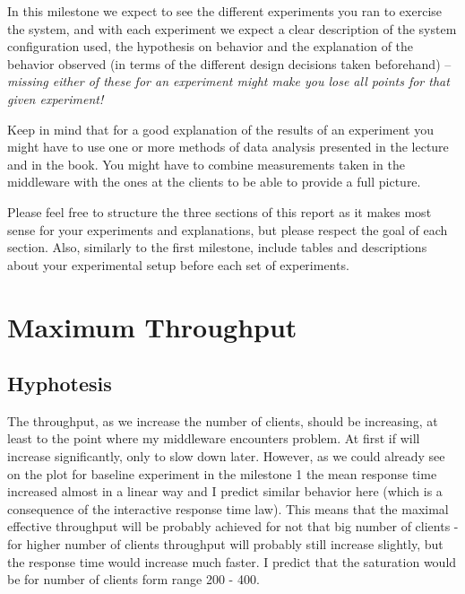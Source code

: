 \documentclass[11pt]{article}
\begin{document}
In this milestone we expect to see the different experiments you ran to exercise the system, and with each experiment we expect a clear description of the system configuration used, the hypothesis on behavior and the explanation of the behavior observed (in terms of the different design decisions taken beforehand) -- \emph{missing either of these for an experiment might make you lose all points for that given experiment!} 

Keep in mind that for a good explanation of the results of an experiment you might have to use one or more methods of data analysis presented in the lecture and in the book. You might have to combine measurements taken in the middleware with the ones at the clients to be able to provide a full picture.

Please feel free to structure the three sections of this report as it makes most sense for your experiments and explanations, but please respect the goal of each section. Also, similarly to the first milestone, include tables and descriptions about your experimental setup before each set of experiments.


\pagebreak

\section{Maximum Throughput}
\label{sec:max-throughput}


\subsection{Hyphotesis}

The throughput, as we increase the number of clients, should be increasing, at least to the point where my middleware encounters problem. At first if will increase significantly, only to slow down later. However, as we could already see on the plot for baseline experiment in the milestone 1 the mean response time increased almost in a linear way and I predict similar behavior here (which is a consequence of the interactive response time law). This means that the maximal effective throughput will be probably achieved for not that big number of clients - for higher number of clients throughput will probably still increase slightly, but the response time would increase much faster. I predict that the saturation would be for number of clients form range 200 - 400.
\end{document}
